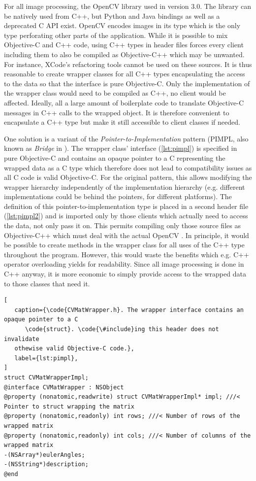 For all image processing, the OpenCV library used in version 3.0. The library
can be natively used from C++, but Python and Java bindings as well as a
deprecated C API exist. OpenCV encodes images in its  type which is
the only type perforating other parts of the application.  While it is possible
to mix Objective-C and C++ code, using C++ types in header files forces every
client including them to also be compiled as Objective-C++ which may be
unwanted. For instance, XCode's refactoring tools cannot be used on these
sources. It is thus reasonable to create wrapper classes for all C++ types
encapsulating the access to the data so that the interface is pure Objective-C.
Only the implementation of the wrapper class would need to be compiled as C++,
no client would be affected. Ideally, all a large amount of boilerplate code to
translate Objective-C messages in C++ calls to the wrapped object.  It is
therefore convenient to encapsulate a C++ type but make it still accessible to
client classes if needed. 

One solution is a variant of the \emph{Pointer-to-Implementation} pattern
(PIMPL, also known as \emph{Bridge} in \citep{gamma1995}). The wrapper class'
interface (\autoref{lst:pimpl}) is specified in pure Objective-C and contains an
opaque pointer to a C  representing the wrapped data as a C type
which therefore does not lead to compatibility issues as all C code is valid
Objective-C. For the original pattern, this allows modifying the wrapper
hierarchy independently of the implementation hierarchy (e.g. different
implementations could be behind the pointers, for different platforms). The
definition of this pointer-to-implementation type is placed in a second header
file (\autoref{lst:pimpl2}) and is imported only by those clients which actually
need to access the data, not only pass it on. This permits compiling only those
source files as Objective-C++ which must deal with the actual OpenCV .
In principle, it would be possible to create methods in the wrapper class for
all uses of the C++ type throughout the program. However, this would waste the
benefits which e.g. C++ operator overloading yields for readability. Since all
image processing is done in C++ anyway, it is more economic to simply provide
access to the wrapped data to those classes that need it.

\lstset{
   language=[Objective]C,
   float,
}

\begin{lstlisting}[
   caption={\code{CVMatWrapper.h}. The wrapper interface contains an opaque pointer to a C
      \code{struct}. \code{\#include}ing this header does not invalidate
   othewise valid Objective-C code.},
   label={lst:pimpl},
]
struct CVMatWrapperImpl;
@interface CVMatWrapper : NSObject
@property (nonatomic,readwrite) struct CVMatWrapperImpl* impl; ///< Pointer to struct wrapping the matrix
@property (nonatomic,readonly) int rows; ///< Number of rows of the wrapped matrix
@property (nonatomic,readonly) int cols; ///< Number of columns of the wrapped matrix
-(NSArray*)eulerAngles;
-(NSString*)description;
@end
\end{lstlisting}

